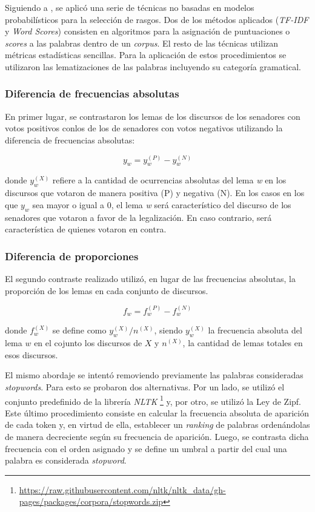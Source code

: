 Siguiendo a \cite{monroe2008fightin}, se aplic\'o una serie de t\'ecnicas
no basadas en modelos probabil\'isticos para la selecci\'on de rasgos.
Dos de los m\'etodos aplicados (\textit{TF-IDF} y \textit{Word Scores}) consisten
en algoritmos para la asignaci\'on de puntuaciones o \textit{scores} a las
palabras dentro de un \textit{corpus}. El resto de las t\'ecnicas utilizan
m\'etricas estad\'isticas sencillas. Para la aplicación de estos procedimientos
se utilizaron las lematizaciones de las palabras incluyendo su categoría
gramatical.

\subsubsection{Diferencia de frecuencias absolutas}
\label{subsubsec-methods-freq-abs}
En primer lugar, se contrastaron los lemas de los discursos de los
senadores con votos positivos conlos de los de senadores con votos negativos
utilizando la diferencia de frecuencias absolutas:

\begin{equation}
y_w = y_{w}^{(P)}-y_{w}^{(N)}
\end{equation}

donde $y_{w}^{(X)}$ refiere a la cantidad de ocurrencias absolutas del lema
\textit{w} en los discursos que votaron de manera positiva (P) y negativa (N).
En los casos en los que $y_{w}$ sea mayor o igual a $0$, el lema \textit{w}
ser\'a caracter\'istico del discurso de los senadores que votaron a favor de
la legalizaci\'on. En caso contrario, ser\'a caracter\'istica de quienes votaron
en contra.

\subsubsection{Diferencia de proporciones}
\label{subsubsec-methods-proportions}
El segundo contraste realizado utiliz\'o, en lugar de las frecuencias absolutas,
la proporci\'on de los lemas en cada conjunto de discursos.

\begin{equation}
    f_w = f_{w}^{(P)}-f_{w}^{(N)}
\end{equation}


donde $f_{w}^{(X)}$ se define como $y_{w}^{(X)} / n^{(X)}$, siendo $y_{w}^{(X)}$
la frecuencia absoluta del lema $w$ en el cojunto los discursos de $X$
y $n^{(X)}$, la cantidad de lemas totales en esos discursos.

El mismo abordaje se intent\'o removiendo previamente las palabras consideradas
\textit{stopwords}. Para esto se probaron dos alternativas. Por un lado, se
utiliz\'o el conjunto predefinido de la librer\'ia \textit{NLTK}
\footnote{\url{https://raw.githubusercontent.com/nltk/nltk_data/gh-pages/packages/corpora/stopwords.zip}}
y, por otro, se utilizó la Ley de Zipf. Este último procedimiento consiste en
calcular la frecuencia absoluta de aparición de
cada token y, en virtud de ella, establecer un \textit{ranking} de palabras
ordenándolas de manera decreciente según su frecuencia de aparición.
Luego, se contrasta dicha frecuencia con el orden asignado y se define
un umbral a partir del cual una palabra es considerada \textit{stopword}.

